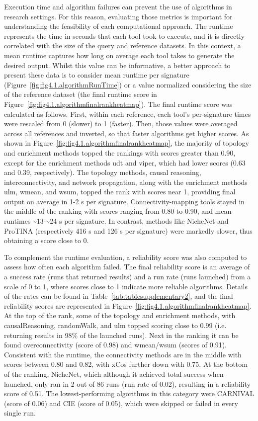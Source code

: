 Execution time and algorithm failures can prevent the use of algorithms in research settings.
For this reason, evaluating those metrics is important for understanding the feasibility of each computational approach.
The runtime represents the time in seconds that each tool took to execute, and it is directly correlated with the size of the query and reference datasets.
In this context, a mean runtime captures how long on average each tool takes to generate the desired output.
Whilst this value can be informative, a better approach to present these data is to consider mean runtime per signature (Figure~\ref{fig:fig4.1.algorithmRunTime}) or a value normalized considering the size of the reference dataset (the final runtime score in Figure~\ref{fig:fig4.1.algorithmfinalrankheatmap}).
The final runtime score was calculated as follows. First, within each reference, each tool's per-signature times were rescaled from 0 (slower) to 1 (faster).
Then, those values were averaged across all references and inverted, so that faster algorithms get higher scores. As shown in Figure~\ref{fig:fig4.1.algorithmfinalrankheatmap}, the majority of topology and enrichment methods topped the rankings with scores greater than 0.90, except for the enrichment methods udt and viper, which had lower scores (0.63 and 0.39, respectively).
The topology methods, causal reasoning, interconnectivity, and network propagation, along with the enrichment methods ulm, wmean, and wsum, topped the rank with scores near 1, providing final output on average in 1-2 s per signature.
Connectivity-mapping tools stayed in the middle of the ranking with scores ranging from 0.80 to 0.90, and mean runtimes \textasciitilde13-\textasciitilde24 s per signature.
In contrast, methods like NicheNet and \gls{ProTINA} (respectively 416 s and 126 s per signature) were markedly slower, thus obtaining a score close to 0.

To complement the runtime evaluation, a reliability score was also computed to assess how often each algorithm failed.
The final reliability score is an average of a success rate (runs that returned results) and a run rate (runs launched) from a scale of 0 to 1, where scores close to 1 indicate more reliable algorithms.
Details of the rates can be found in Table~\ref{tab:tablesupplementary2}, and the final reliability scores are represented in Figure~\ref{fig:fig4.1.algorithmfinalrankheatmap}.
At the top of the rank, some of the topology and enrichment methods, with causalReasoning, randomWalk, and ulm topped scoring close to 0.99 (i.e. returning results in 98\% of the launched runs).
Next in the ranking it can be found overconnectivity (score of 0.98) and wmean/wsum (scores of 0.91).
Consistent with the runtime, the connectivity methods are in the middle with scores between 0.80 and 0.82, with \gls{xCos} further down with 0.75.
At the bottom of the ranking, NicheNet, which although it achieved total success when launched, only ran in 2 out of 86 runs (run rate of 0.02), resulting in a reliability score of 0.51.
The lowest-performing algorithms in this category were \gls{CARNIVAL} (score of 0.06) and \gls{CIE} (score of 0.05), which were skipped or failed in every single run. 

